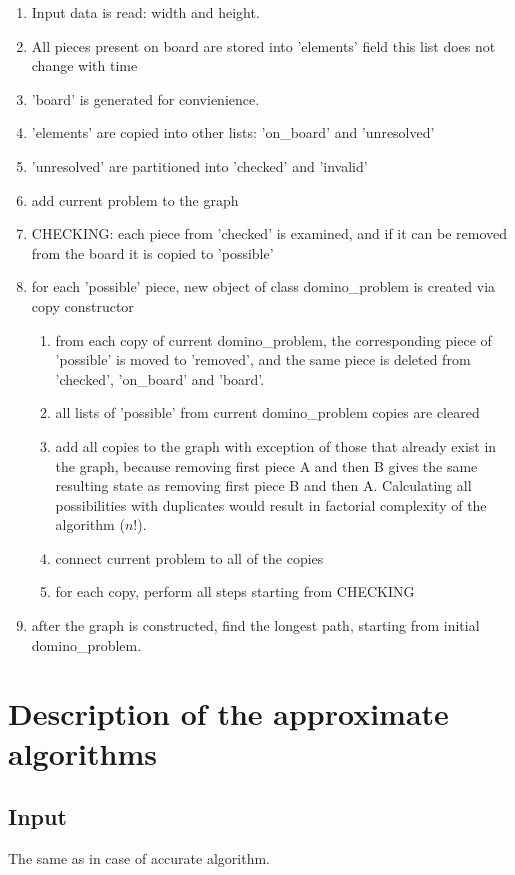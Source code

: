 \documentclass{article}
\begin{document}
\begin{enumerate}
   \item Input data is read: width and height.
   \item All pieces present on board are stored into 'elements' field
   this list does not change with time
   \item 'board' is generated for convienience.
   \item 'elements' are copied into other lists: 'on\_board' and 'unresolved'
   \item 'unresolved' are partitioned into 'checked' and 'invalid'
   \item add current problem to the graph
   \item CHECKING: each piece from 'checked' is examined, and if it can be removed 
   from the board it is copied to 'possible'
   \item for each 'possible' piece, new object of class domino\_problem is created
   via copy constructor
   \begin{enumerate}
	   \item from each copy of current domino\_problem, the corresponding piece of 'possible'
	   is moved to 'removed', and the same piece is deleted from 'checked', 'on\_board' 
	   and 'board'.
	   \item all lists of 'possible' from current domino\_problem copies are cleared
	   \item add all copies to the graph with exception of those that already exist
	   in the graph, because removing first piece A and then B gives the same resulting state 
	   as removing first piece B and then A. Calculating all possibilities with duplicates would
	   result in factorial complexity of the algorithm ($n!$).
	   \item connect current problem to all of the copies
	   \item for each copy, perform all steps starting from CHECKING
	\end{enumerate}
	\item after the graph is constructed, find the longest path, starting from 
   initial domino\_problem.
\end{enumerate}

\section{Description of the approximate algorithms}
\subsection{Input}
The same as in case of accurate algorithm.
\end{document}
